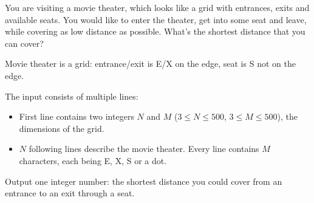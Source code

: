\problemname{\problemyamlname}


\newcommand{\minn}{3}
\newcommand{\maxn}{500}
\newcommand{\minm}{3}
\newcommand{\maxm}{500}

You are visiting a movie theater, which looks like a grid with entrances, exits and available seats. You would like to enter the theater, get into some seat and leave, while covering as low distance as possible. What's the shortest distance that you can cover?

Movie theater is a grid: entrance/exit is E/X on the edge, seat is S not on the edge.

\begin{Input}
    The input consists of multiple lines:
    \begin{itemize}
        \item First line contains two integers $N$ and $M$ ($\minn \leq N \leq \maxn$, $\minm \leq M \leq \maxm$), the dimensions of the grid.
        \item $N$ following lines describe the movie theater. Every line contains $M$ characters, each being E, X, S or a dot.
     \end{itemize}
\end{Input}

\begin{Output}
    Output one integer number: the shortest distance you could cover from an entrance to an exit through a seat.
\end{Output}
